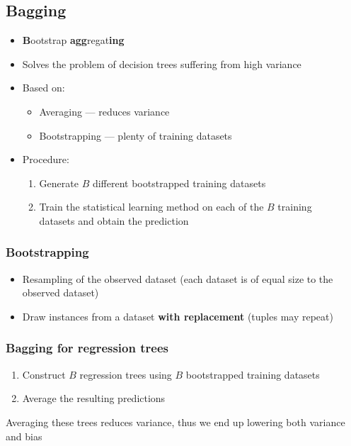 \documentclass{article}
\begin{document}
        \subsection{Bagging}
        \begin{itemize}
            \item \textbf{B}ootstrap \textbf{agg}regat\textbf{ing}
            \item Solves the problem of decision trees suffering from high variance
            \item Based on:
            \begin{itemize}
                \item Averaging --- reduces variance
                \item Bootstrapping --- plenty of training datasets
            \end{itemize}
            \item Procedure:
            \begin{enumerate}
                \item Generate $B$ different bootstrapped training datasets
                \item Train the statistical learning method on each of the $B$ training \\ datasets and obtain the prediction
            \end{enumerate}
        \end{itemize}

            \subsubsection{Bootstrapping}
            \begin{itemize}
                \item Resampling of the observed dataset (each dataset is of equal size to the observed dataset)
                \item Draw instances from a dataset \textbf{with replacement} (tuples may repeat)
            \end{itemize}

            \subsubsection{Bagging for regression trees}
            \begin{enumerate}
                \item Construct $B$ regression trees using $B$ bootstrapped training datasets
                \item Average the resulting predictions
            \end{enumerate}
            Averaging these trees reduces variance, thus we end up lowering both variance and bias
\end{document}
